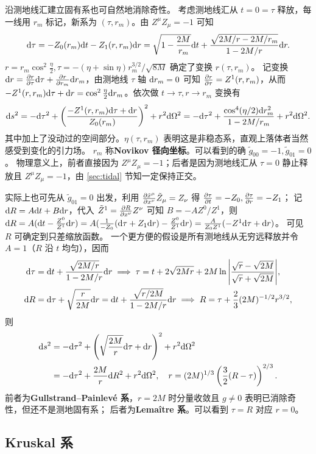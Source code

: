 沿测地线汇建立固有系也可自然地消除奇性。
考虑测地线汇从 $t = 0 = \tau$ 释放，每一线用 $r_m$ 标记，新系为 $(\tau,r_m)$。由 $Z^\mu Z_\mu = -1$ 可知
\[\dd\tau=-Z_0(r_m)\dd t-Z_1(r,r_m)\dd r=\sqrt{1-\frac{2M}{r_m}}\dd t+\frac{\sqrt{2M/{r}-2M/{r_m}}}{1-{2M}/{r}}\dd r.\]
$r = r_m\cos^2\frac{\eta}{2},\tau = -(\eta+\sin\eta){r_m^{3/2}}/{\sqrt{8M}}$ 确定了变换 $r(\tau,r_m)$。
记变换 $\dd r = \pdv{r}{\tau}\dd\tau + \pdv{r}{r_m}\dd r_m$，由测地线 $\tau$ 轴 $\dd r_m = 0$ 可知 $\pdv{r}{\tau} = Z^1(r,r_m)$，从而 $-Z^1(r,r_m)\dd\tau+\dd r=\cos^2\frac{\eta}{2}\dd r_m$。依次做 $t\to\tau,r\to r_m$ 变换有
\[\dd s^2 = -\dd\tau^2+\left(\frac{-Z^1(r,r_m)\dd\tau+\dd r}{Z_0(r_m)}\right)^2+r^2\dd\Omega^2= -\dd\tau^2+\frac{\cos^4({\eta}/{2})\dd r_m^2}{1-2M/r_m}+r^2\dd\Omega^2.\]
其中加上了没动过的空间部分。$\eta(\tau,r_m)$ 表明这是非稳态系，直观上落体者当然感受到变化的引力场。
$r_m$ 称\textbf{Novikov 径向坐标}。可以看到的确 $\tilde g_{00}=-1,\tilde g_{01}=0$。
物理意义上，前者直接因为 $Z^\mu Z_\mu = -1$；后者是因为测地线汇从 $\tau = 0$ 静止释放且 $Z^\mu Z_\mu = -1$，由 \ref{sec:tidal} 节知一定保持正交。

实际上也可先从 $\tilde g_{01}=0$ 出发，利用 $\pdv{\tilde x^\mu}{x^\nu}\tilde Z_\mu=Z_\nu$ 得 $\pdv{\tau}{t}=-Z_0,\pdv{\tau}{r}=-Z_1$；
记 $\dd R=A\dd t+B\dd r$，代入 $\tilde Z^1=\pdv{R}{x^\nu}Z^\nu$ 可知 $B=-AZ^0/Z^1$，则 $\dd R=A(\dd t-\frac{Z^0}{Z^1}\dd r)=A(\frac{1}{-Z_0}(\dd\tau+Z_1\dd r)-\frac{Z^0}{Z^1}\dd r)=\frac{A}{Z_0Z^1}(-Z^1\dd\tau+\dd r)$。
可见 $R$ 可确定到只差缩放函数。
一个更方便的假设是所有测地线从无穷远释放并令 $A=1$（$R$ 沿 $t$ 均匀），因而
\begin{align}
    \dd\tau &= \dd t+\frac{\sqrt{2M/r}}{1-{2M}/{r}}\dd r\implies \tau = t+2 \sqrt{2Mr}+2M\ln\abs{\frac{\sqrt{r}-\sqrt{2M}}{\sqrt{r}+\sqrt{2M}}},\\
    \dd R &= \dd\tau+\sqrt{\frac{r}{2M}}\dd r = \dd t+\frac{\sqrt{r/2M}}{1-{2M}/{r}}\dd r\implies R=\tau+\frac 23(2M)^{-1/2}r^{3/2},
\end{align}
则
\begin{align}
    \dd s^2 &= -\dd\tau^2+\left(\sqrt{\frac{2M}{r}}\dd\tau+\dd r\right)^2+r^2\dd\Omega^2\\
    &= -\dd\tau^2+\frac{2M}{r}\dd R^2+r^2\dd\Omega^2,\quad r=(2M)^{1/3}\left(\frac 32(R-\tau)\right)^{2/3}.
\end{align}
前者为\textbf{Gullstrand–Painlevé 系}，$r=2M$ 时分量收敛且 $g\ne 0$ 表明已消除奇性，但还不是测地固有系； 
后者为\textbf{Lemaître 系}。可以看到 $\tau=R$ 对应 $r=0$。

\subsection{Kruskal 系}

